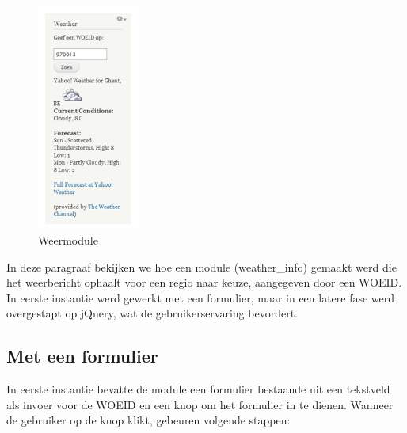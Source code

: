 \begin{figure}
\vspace{-40pt}
\hspace{-10pt}
\centering
\includegraphics[width=0.3\textwidth]{fig/weermodule}
\vspace{-30pt}
\hspace{-10pt}
\centering
\caption{Weermodule}
\label{fig:weermodule}
\vspace{-70pt}
\end{figure}

In deze paragraaf bekijken we hoe een module (weather\_info) gemaakt werd die het weerbericht ophaalt voor een regio naar keuze, aangegeven door een WOEID. In eerste instantie werd gewerkt met een formulier, maar in een latere fase werd overgestapt op jQuery, wat de gebruikerservaring bevordert.

\subsection{Met een formulier}

In eerste instantie bevatte de module een formulier bestaande uit een tekstveld als invoer voor de WOEID en een knop om het formulier in te dienen.
Wanneer de gebruiker op de knop klikt, gebeuren volgende stappen:

